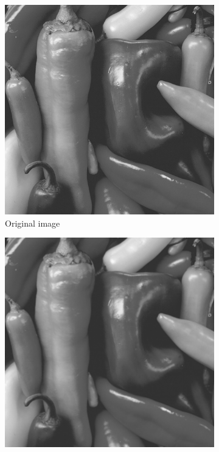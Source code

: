 \begin{markdown}
\begin{figure}[H]
  \centering
  \begin{subfigure}{.49\textwidth}
    \centering
    \includegraphics[width=1\textwidth]{body/figures/results/blur/input.png}
    \caption{Original image}
    \label{fig:res:blur:pic:input}
  \end{subfigure}%
  \hspace{.01\textwidth}
  \begin{subfigure}{.49\textwidth}
    \centering
    \includegraphics[width=1\textwidth]{body/figures/results/blur/cuda.png}

\end{subfigure}
\end{figure}
\end{markdown}
